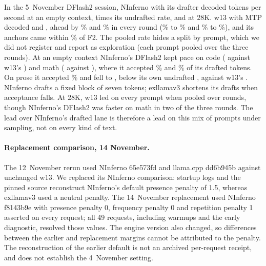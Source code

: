 \documentclass[11pt,letterpaper]{article}
\begin{document}
In the 5~November DFlash2 session, NInferno with its drafter decoded \PeDfbNifDfZero{}
tokens per second at an empty context, \PeDfbNifDfGain{} times its undrafted
rate, and \PeDfbNifDfDeep{} at 28K. w13 with MTP decoded \PeDfbWMtpZero{} and
\PeDfbWMtpDeep, ahead by \PeDfbPNifDfZero\% and \PeDfbPNifDfDeep\% in every
round (\PeDfbPNifDfZeroLo\% to \PeDfbPNifDfZeroHi\% and \PeDfbPNifDfDeepLo\%
to \PeDfbPNifDfDeepHi\%), and its anchors came within \PeDfbFtwoMax\% of F2. The pooled
rate hides a split by prompt, which we did not register and report as
exploration (each prompt pooled over the three rounds). At an empty context
NInferno's DFlash2 kept pace on code (\PeDfbPpNifDfZeroCode{} against w13's
\PeDfbPpWMtpZeroCode) and math (\PeDfbPpNifDfZeroMath{} against
\PeDfbPpWMtpZeroMath), where it accepted \PeDfbAccZeroCode\% and
\PeDfbAccZeroMath\% of its drafted tokens. On prose it accepted
\PeDfbAccZeroProse\% and fell to \PeDfbPpNifDfZeroProse, below its own
undrafted \PeDfbPpNifXxsZeroProse, against w13's \PeDfbPpWMtpZeroProse.
NInferno drafts a fixed block of seven tokens; exllamav3 shortens its drafts
when acceptance falls. At 28K, w13 led on every prompt when pooled over rounds, though
NInferno's DFlash2 was faster on math in two of the three rounds. The lead
over NInferno's drafted lane is therefore a lead on this mix of prompts
under sampling, not on every kind of text.

\paragraph{Replacement comparison, 14 November.}
The 12~November rerun used NInferno 65e573fd and llama.cpp dd6b945b against
unchanged w13. We replaced its NInferno comparison: startup logs and the
pinned source reconstruct NInferno's default presence penalty of 1.5,
whereas exllamav3 used a neutral penalty. The 14~November replacement used
NInferno f8143b9e with presence penalty 0, frequency penalty 0 and repetition
penalty 1 asserted on every request; all 49 requests, including warmups and
the early diagnostic, resolved those values. The engine version also changed,
so differences between the earlier and replacement margins cannot be
attributed to the penalty. The reconstruction of the earlier default is not
an archived per-request receipt, and does not establish the 4~November setting.
\end{document}
